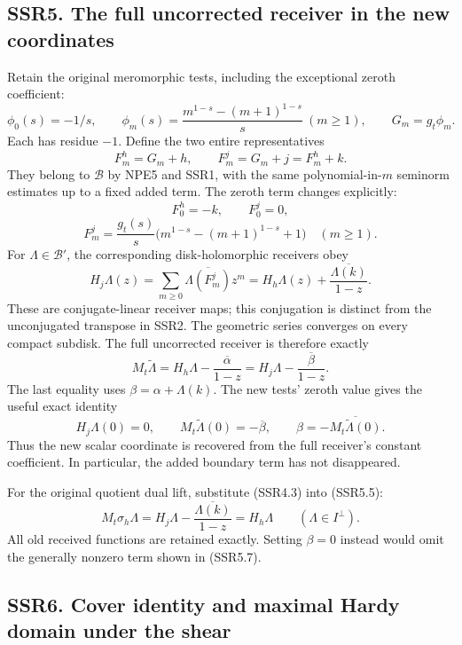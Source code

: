 \subsection{SSR5. The full uncorrected receiver in the new
coordinates}\label{ssr5.-the-full-uncorrected-receiver-in-the-new-coordinates}

Retain the original meromorphic tests, including the exceptional zeroth
coefficient: \[
\phi_0(s)=-1/s,\qquad
\phi_m(s)=\frac{m^{1-s}-(m+1)^{1-s}}s\ (m\ge1),
\qquad G_m=g_t\phi_m.
\tag{SSR5.1}
\] Each has residue \(-1\). Define the two entire representatives \[
F_m^h=G_m+h,\qquad F_m^j=G_m+j=F_m^h+k.
\tag{SSR5.2}
\] They belong to \(\mathcal B\) by NPE5 and SSR1, with the same
polynomial-in-\(m\) seminorm estimates up to a fixed added term. The
zeroth term changes explicitly: \[
F_0^h=-k,\qquad F_0^j=0,
\] \[
F_m^j=\frac{g_t(s)}s
\bigl(m^{1-s}-(m+1)^{1-s}+1\bigr)\quad(m\ge1).
\tag{SSR5.3}
\] For \(\Lambda\in\mathcal B'\), the corresponding disk-holomorphic
receivers obey \[
H_j\Lambda(z)=\sum_{m\ge0}\overline{\Lambda(F_m^j)}z^m
=H_h\Lambda(z)+\frac{\overline{\Lambda(k)}}{1-z}.
\tag{SSR5.4}
\] These are conjugate-linear receiver maps; this conjugation is
distinct from the unconjugated transpose in SSR2. The geometric series
converges on every compact subdisk. The full uncorrected receiver is
therefore exactly \[
\boxed{M_t\widetilde\Lambda
=H_h\Lambda-\frac{\overline\alpha}{1-z}
=H_j\Lambda-\frac{\overline\beta}{1-z}.}
\tag{SSR5.5}
\] The last equality uses \(\beta=\alpha+\Lambda(k)\). The new tests'
zeroth value gives the useful exact identity \[
H_j\Lambda(0)=0,\qquad
M_t\widetilde\Lambda(0)=-\overline\beta,
\qquad\beta=-\overline{M_t\widetilde\Lambda(0)}.
\tag{SSR5.6}
\] Thus the new scalar coordinate is recovered from the full receiver's
constant coefficient. In particular, the added boundary term has not
disappeared.

For the original quotient dual lift, substitute (SSR4.3) into (SSR5.5):
\[
M_t\sigma_h\Lambda
=H_j\Lambda-\frac{\overline{\Lambda(k)}}{1-z}
=H_h\Lambda\qquad(\Lambda\in I^\perp).
\tag{SSR5.7}
\] All old received functions are retained exactly. Setting \(\beta=0\)
instead would omit the generally nonzero term shown in (SSR5.7).

\subsection{SSR6. Cover identity and maximal Hardy domain under the
shear}\label{ssr6.-cover-identity-and-maximal-hardy-domain-under-the-shear}


